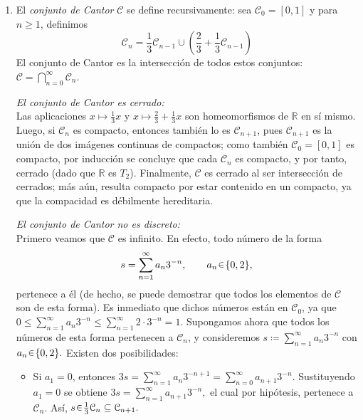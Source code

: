 \begin{sol}[Demostración]
\begin{enumerate}[label = (\alph*)]
    \item El \emph{conjunto de Cantor} $\mathcal{C}$ se define recursivamente: sea $\mathcal{C}_0 = [0,1]$ y para $n \geq 1$, definimos
    \[
        \mathcal{C}_n = \frac{1}{3}\mathcal{C}_{n-1} \cup \left( \frac{2}{3} + \frac{1}{3}\mathcal{C}_{n-1} \right)
    \]
    El conjunto de Cantor es la intersección de todos estos conjuntos:
    \(
    \mathcal{C} = \bigcap_{n=0}^{\infty} \mathcal{C}_n.
    \)\par\vspace{1em}
    \emph{El conjunto de Cantor es cerrado:}\\
    Las aplicaciones $x \mapsto \tfrac{1}{3}x$ y $x \mapsto \tfrac{2}{3} + \tfrac{1}{3}x$ son homeomorfismos de $\mathbb{R}$ en sí mismo. Luego, si $\mathcal{C}_n$ es compacto, entonces también lo es $\mathcal{C}_{n+1}$, pues $\mathcal{C}_{n+1}$ es la unión de dos imágenes continuas de compactos; como también $\mathcal{C}_{0} = [0,1]$ es compacto, por inducción se concluye que cada $\mathcal{C}_{n}$ es compacto, y por tanto, cerrado (dado que $\mathbb{R}$ es $T_2$). Finalmente, $\mathcal{C}$ es cerrado al ser intersección de cerrados; más aún, resulta compacto por estar contenido en un compacto, ya que la compacidad es débilmente hereditaria.\vspace{1em}

    \emph{El conjunto de Cantor no es discreto:}\\
    Primero veamos que $\mathcal{C}$ es infinito. En efecto, todo número de la forma 
    \[
        s = \sum_{n=1}^\infty a_n 3^{-n}, 
        \qquad a_n \en \{0,2\},
    \]
    pertenece a él (de hecho, se puede demostrar que todos los elementos de $\mathcal{C}$ son de esta forma).  
    Es inmediato que dichos números están en $\mathcal{C}_0$, ya que
    $
        0 \leq \sum_{n=1}^\infty a_n 3^{-n} 
          \leq \sum_{n=1}^\infty 2 \cdot 3^{-n} 
          = 1.
    $
    Supongamos ahora que todos los números de esta forma pertenecen a $\mathcal{C}_n$, y consideremos
    $
        s \coloneq \sum_{n=1}^\infty a_n 3^{-n}$ con $
        a_n \en \{0,2\}.
    $
    Existen dos posibilidades:
    \begin{itemize}
        \item Si $a_1 = 0$, entonces
        $
            3s = \sum_{n=1}^\infty a_n 3^{-n+1} 
                = \sum_{n=0}^\infty a_{n+1} 3^{-n}.
        $
        Sustituyendo $a_1=0$ se obtiene
        $
            3s = \sum_{n=1}^\infty a_{n+1} 3^{-n},
        $
        el cual por hipótesis, pertenece a $\mathcal{C}_n$. Así,
        $
            s \en \tfrac{1}{3}\mathcal{C}_n \subseteq \mathcal{C}_{n+1}.
        $
    

\end{itemize}
\end{enumerate}
\end{sol}
